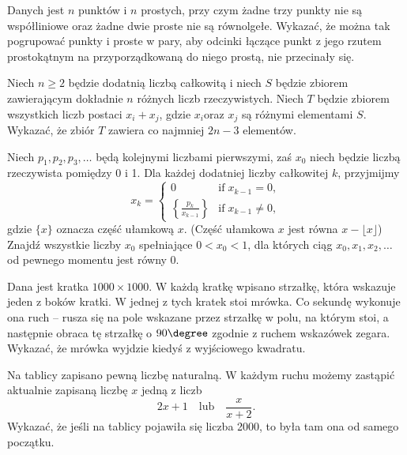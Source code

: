 \begin{problem}{1}
	Danych jest $n$ punktów i $n$ prostych, przy czym żadne trzy punkty nie są współliniowe oraz żadne dwie proste nie są równolgełe. Wykazać, że można tak pogrupować punkty i proste w pary, aby odcinki łączące punkt z jego rzutem prostokątnym na przyporządkowaną do niego prostą, nie przecinały się.
\end{problem}

\begin{problem}{2}
	Niech $n \geqslant 2$ będzie dodatnią liczbą całkowitą i niech $S$ będzie zbiorem zawierającym dokładnie $n$ różnych liczb rzeczywistych. Niech $T$ będzie zbiorem wszystkich liczb postaci $x_i + x_j$, gdzie $x_i$oraz $x_j$ są różnymi elementami $S$. Wykazać, że zbiór $T$ zawiera co najmniej $2n - 3$ elementów.
\end{problem}

\begin{problem}{3}
	Niech $p_1, p_2, p_3, \ldots$ będą kolejnymi liczbami pierwszymi, zaś $x_0$ niech będzie liczbą rzeczywista pomiędzy 0 i 1. Dla każdej dodatniej liczby całkowitej $k$, przyjmijmy
\[
	x_k = \begin{cases} 0 & \mbox{if} \; x_{k-1} = 0, \\[.1in] {\displaystyle \left\{ \frac{p_k}{x_{k-1}} \right\}} & \mbox{if} \; x_{k-1} \neq 0, \end{cases}  
\]
gdzie $\{x\}$ oznacza część ułamkową $x$. (Część ułamkowa $x$ jest równa $x - \lfloor x \rfloor$) Znajdź wszystkie liczby $x_0$ spełniające $0 < x_0 < 1$, dla których ciąg $x_0, x_1, x_2, \ldots$ od pewnego momentu jest równy 0.
\end{problem}

\begin{problem}{4}
	Dana jest kratka $1000\times 1000$. W każdą kratkę wpisano strzałkę, która wskazuje jeden z boków kratki. W jednej z tych kratek stoi mrówka. Co sekundę wykonuje ona ruch -- rusza się na pole wskazane przez strzałkę w polu, na którym stoi, a następnie obraca tę strzałkę o $90\degree$ zgodnie z ruchem wskazówek zegara. Wykazać, że mrówka wyjdzie kiedyś z wyjściowego kwadratu.
\end{problem}

\begin{problem}{5}
Na tablicy zapisano pewną liczbę naturalną. W każdym ruchu możemy zastąpić aktualnie zapisaną liczbę $x$ jedną z liczb 
\[
    2x + 1 \quad  \text{lub} \quad \dfrac{x}{x + 2}.
\]
Wykazać, że jeśli na tablicy pojawiła się liczba 2000, to była tam ona od samego początku.
\end{problem}

